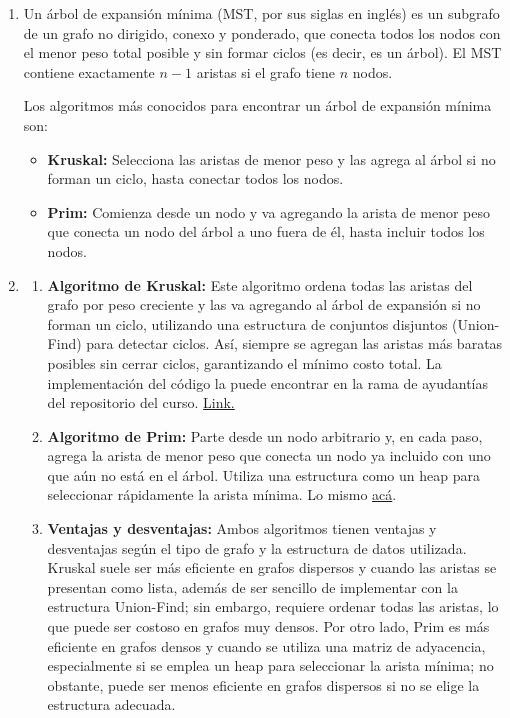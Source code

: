 \documentclass[12pt]{article}
\begin{document}
\begin{enumerate}
            \item Un árbol de expansión mínima (MST, por sus siglas en inglés) es un subgrafo de un grafo no dirigido, conexo y ponderado, que conecta todos los nodos con el menor peso total posible y sin formar ciclos (es decir, es un árbol). El MST contiene exactamente $n-1$ aristas si el grafo tiene $n$ nodos.

            Los algoritmos más conocidos para encontrar un árbol de expansión mínima son:
            \begin{itemize}
                \item \textbf{Kruskal:} Selecciona las aristas de menor peso y las agrega al árbol si no forman un ciclo, hasta conectar todos los nodos.
                \item \textbf{Prim:} Comienza desde un nodo y va agregando la arista de menor peso que conecta un nodo del árbol a uno fuera de él, hasta incluir todos los nodos.
            \end{itemize}

            \item 
            \begin{enumerate}[label=\alph*)]
                \item \textbf{Algoritmo de Kruskal:} Este algoritmo ordena todas las aristas del grafo por peso creciente y las va agregando al árbol de expansión si no forman un ciclo, utilizando una estructura de conjuntos disjuntos (Union-Find) para detectar ciclos. Así, siempre se agregan las aristas más baratas posibles sin cerrar ciclos, garantizando el mínimo costo total. La implementación del código la puede encontrar en la rama de ayudantías del repositorio del curso. \href{https://github.com/otrab/EDA/tree/ayudant%C3%ADas}{Link.}

                \item \textbf{Algoritmo de Prim:} Parte desde un nodo arbitrario y, en cada paso, agrega la arista de menor peso que conecta un nodo ya incluido con uno que aún no está en el árbol. Utiliza una estructura como un heap para seleccionar rápidamente la arista mínima. Lo mismo \href{https://github.com/otrab/EDA/tree/ayudant%C3%ADas}{acá}.

                \item \textbf{Ventajas y desventajas:}
                Ambos algoritmos tienen ventajas y desventajas según el tipo de grafo y la estructura de datos utilizada. Kruskal suele ser más eficiente en grafos dispersos y cuando las aristas se presentan como lista, además de ser sencillo de implementar con la estructura Union-Find; sin embargo, requiere ordenar todas las aristas, lo que puede ser costoso en grafos muy densos. Por otro lado, Prim es más eficiente en grafos densos y cuando se utiliza una matriz de adyacencia, especialmente si se emplea un heap para seleccionar la arista mínima; no obstante, puede ser menos eficiente en grafos dispersos si no se elige la estructura adecuada.
            \end{enumerate}


\end{enumerate}
\end{document}

